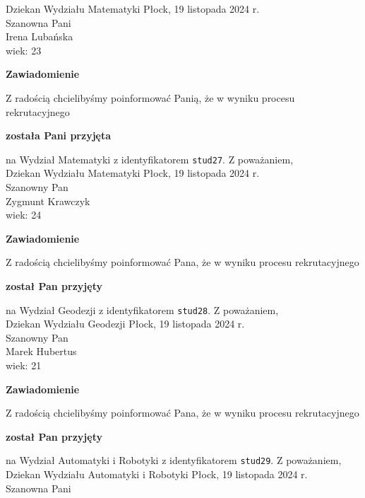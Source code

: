 \documentclass[12pt,a4paper]{article}
\begin{document}
Dziekan
Wydziału Matematyki
\newpage
\hfill Płock, 19 listopada 2024 r. \\
\noindent
Szanowna Pani \\
Irena Lubańska  \\
wiek: 23
\bigskip
\begin{center}
    {\Large\textbf{Zawiadomienie}}
\end{center}
\bigskip 
Z radością chcielibyśmy poinformować Panią, że w wyniku procesu rekrutacyjnego
\begin{center}
\textsf{\textbf{została Pani przyjęta}}
\end{center}
na Wydział Matematyki z identyfikatorem \verb|stud27|. 
\vspace{2cm}
\noindent
Z poważaniem, \\
Dziekan
Wydziału Matematyki
\newpage
\hfill Płock, 19 listopada 2024 r. \\
\noindent
Szanowny Pan \\
Zygmunt Krawczyk \\
wiek: 24
\bigskip
\begin{center}
    {\Large\textbf{Zawiadomienie}}
\end{center}
\bigskip 
Z radością chcielibyśmy poinformować Pana, że w wyniku procesu rekrutacyjnego
\begin{center}
\textsf{\textbf{został Pan przyjęty}}
\end{center}
na Wydział Geodezji z identyfikatorem \verb|stud28|. 
\vspace{2cm}
\noindent
Z poważaniem, \\
Dziekan
Wydziału Geodezji
\newpage
\hfill Płock, 19 listopada 2024 r. \\
\noindent
Szanowny Pan \\
Marek Hubertus \\
wiek: 21
\bigskip
\begin{center}
    {\Large\textbf{Zawiadomienie}}
\end{center}
\bigskip 
Z radością chcielibyśmy poinformować Pana, że w wyniku procesu rekrutacyjnego
\begin{center}
\textsf{\textbf{został Pan przyjęty}}
\end{center}
na Wydział Automatyki i Robotyki z identyfikatorem \verb|stud29|. 
\vspace{2cm}
\noindent
Z poważaniem, \\
Dziekan
Wydziału Automatyki i Robotyki
\newpage
\hfill Płock, 19 listopada 2024 r. \\
\noindent
Szanowna Pani \\
\end{document}
